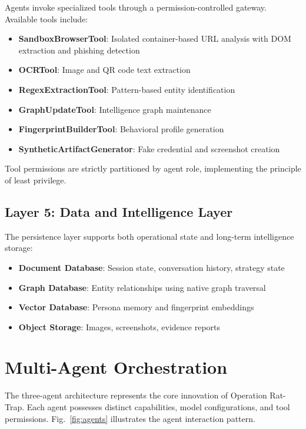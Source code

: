 \documentclass[conference]{IEEEtran}
\begin{document}
Agents invoke specialized tools through a permission-controlled gateway. Available tools include:

\begin{itemize}
    \item \textbf{SandboxBrowserTool}: Isolated container-based URL analysis with DOM extraction and phishing detection
    \item \textbf{OCRTool}: Image and QR code text extraction
    \item \textbf{RegexExtractionTool}: Pattern-based entity identification
    \item \textbf{GraphUpdateTool}: Intelligence graph maintenance
    \item \textbf{FingerprintBuilderTool}: Behavioral profile generation
    \item \textbf{SyntheticArtifactGenerator}: Fake credential and screenshot creation
\end{itemize}

Tool permissions are strictly partitioned by agent role, implementing the principle of least privilege.

\subsection{Layer 5: Data and Intelligence Layer}

The persistence layer supports both operational state and long-term intelligence storage:

\begin{itemize}
    \item \textbf{Document Database}: Session state, conversation history, strategy state
    \item \textbf{Graph Database}: Entity relationships using native graph traversal
    \item \textbf{Vector Database}: Persona memory and fingerprint embeddings
    \item \textbf{Object Storage}: Images, screenshots, evidence reports
\end{itemize}

\section{Multi-Agent Orchestration}

The three-agent architecture represents the core innovation of Operation Rat-Trap. Each agent possesses distinct capabilities, model configurations, and tool permissions. Fig.~\ref{fig:agents} illustrates the agent interaction pattern.
\end{document}
